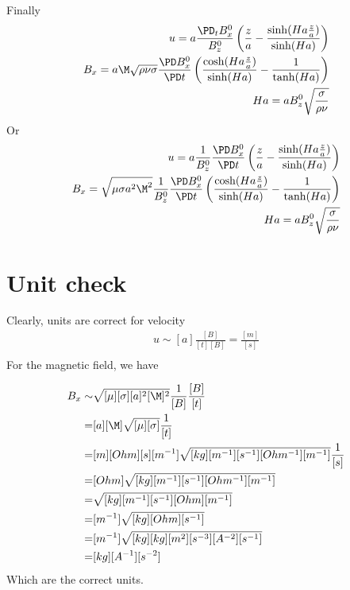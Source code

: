 \documentclass[11pt]{article}
\begin{document}
Finally
\begin{equation}\begin{aligned}
u   = a \frac{\PD_t B_x^0}{ B_z^0} \left( \frac{z}{a} - \frac{\sinh(Ha \frac{z}{a})}{\sinh(Ha)} \right) \\
B_x = a \M \sqrt{\rho \nu \sigma}  \frac{\PD B_x^0}{\PD t} \left( \frac{\cosh(Ha \frac{z}{a})}{\sinh(Ha)} - \frac{1}{\tanh(Ha)} \right) \\
Ha = a B_z^0 \sqrt{\frac{\sigma}{\rho \nu}} \\
\end{aligned} \end{equation}
Or
\begin{equation}\begin{aligned}
u   = a \frac{1}{B_z^0} \frac{\PD B_x^0}{\PD t}  \left( \frac{z}{a} - \frac{\sinh(Ha \frac{z}{a})}{\sinh(Ha)} \right) \\
B_x = \sqrt{\mu \sigma a^2 \M^2} \frac{1}{B_z^0} \frac{\PD B_x^0}{\PD t} \left( \frac{\cosh(Ha \frac{z}{a})}{\sinh(Ha)} - \frac{1}{\tanh(Ha)} \right) \\
Ha = a B_z^0 \sqrt{\frac{\sigma}{\rho \nu}} \\
\end{aligned} \end{equation}

\section{Unit check}
Clearly, units are correct for velocity
\begin{equation}\begin{aligned}
u  \sim [a] \frac{[B]}{[t] [B]} = \frac{[m]}{[s]} \\
\end{aligned} \end{equation}
For the magnetic field, we have

\begin{equation}\begin{aligned}
B_x \sim & \sqrt{[\mu] [\sigma] [a]^2 [\M]^2} \frac{1}{[B]} \frac{[B]}{[t]}  \\
       = & [a] [\M] \sqrt{[\mu] [\sigma]} \frac{1}{[t]} \\
       = & [m] [Ohm] [s] [m^{-1}] \sqrt{[kg] [m^{-1}] [s^{-1}] [Ohm^{-1}] [m^{-1}]} \frac{1}{[s]} \\
       = & [Ohm] \sqrt{[kg] [m^{-1}] [s^{-1}] [Ohm^{-1}] [m^{-1}]} \\
       = & \sqrt{[kg] [m^{-1}] [s^{-1}] [Ohm] [m^{-1}]} \\
       = & [m^{-1}] \sqrt{[kg] [Ohm] [s^{-1}]} \\
       = & [m^{-1}] \sqrt{[kg] [kg] [m^2] [s^{-3}] [A^{-2}] [s^{-1}]} \\
       = & [kg] [A^{-1}] [s^{-2}] \\
\end{aligned} \end{equation}
Which are the correct units.
\end{document}
